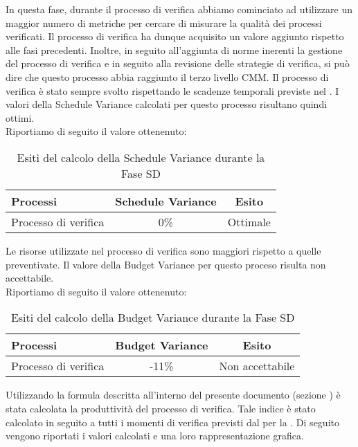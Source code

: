 			In questa fase, durante il processo di verifica abbiamo cominciato ad utilizzare un maggior numero di metriche per cercare di misurare la qualità dei processi verificati. Il processo di verifica ha dunque acquisito un valore aggiunto rispetto alle fasi precedenti. Inoltre, in seguito all'aggiunta di norme inerenti la gestione del processo di verifica e in seguito alla revisione delle strategie di verifica, si può dire che questo processo abbia raggiunto il terzo livello CMM. 
			Il processo di verifica è stato sempre svolto rispettando le scadenze temporali previste nel . I valori della Schedule Variance calcolati per questo processo risultano quindi ottimi.\\
			Riportiamo di seguito il valore ottenenuto:
			\begin{table}[H]
					\centering
					\begin{tabu}{| l | c | c |}
							\hline
							Processi 							& Schedule Variance	& Esito		\\ \hline \hline
							Processo di verifica & 0\% & Ottimale \\ \hline
						\end{tabu}
					\caption{Esiti del calcolo della Schedule Variance durante la Fase SD}
				\end{table}	

			Le risorse utilizzate nel processo di verifica sono maggiori rispetto a quelle preventivate. Il valore della Budget Variance per questo proceso risulta non accettabile.\\ 
			Riportiamo di seguito il valore ottenenuto:
			\begin{table}[H]
					\centering
					\begin{tabu}{| l | c | c |}
							\hline
							Processi 							& Budget Variance	& Esito		\\ \hline \hline
							Processo di verifica & -11\% & Non accettabile \\ \hline
						\end{tabu}
					\caption{Esiti del calcolo della Budget Variance durante la Fase SD}
				\end{table}	
							
			Utilizzando la formula descritta all'interno del presente documento (sezione ) è stata calcolata la produttività del processo di verifica. Tale indice è stato calcolato in seguito a tutti i momenti di verifica previsti dal  per la . Di seguito vengono riportati i valori calcolati e una loro rappresentazione grafica.

